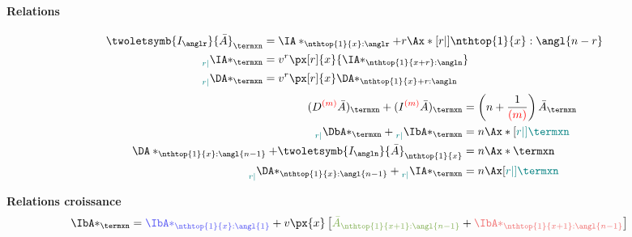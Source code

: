 \documentclass[10pt, french]{article}
\begin{document}
\begin{multicols*}{3}
\begin{enumerate}
\end{enumerate}


\paragraph{Relations} 

\begin{align*}
\twoletsymb{I_{\anglr}}{\bar{A}}_{\termxn} &= \IA*_{\nthtop{1}{x}:\anglr} + r \Ax*[r|]{\nthtop{1}{x}:\angl{n-r}}\\
	{\prescript{}{\color{teal}{r|}}{\IA*_{\termxn}}} &= v^{r} \px[r]{x} {\IA*_{\nthtop{1}{x + r}:\angln}}\\
	{\prescript{}{\color{teal}{r|}}{\DA*_{\termxn}}} &= v^{r}\px[r]{x}\DA*_{\nthtop{1}{x} + r:\angln}\\
\end{align*}
\begin{align*}
	{(D^{\color{red}{(m)}}\bar{A})_{\termxn}} + (I^{\color{red}{(m)}}\bar{A})_{\termxn} &= \left(n + \frac{1}{{\color{red}{(m)}}} \right) \bar{A}_{\termxn}\\
	{\prescript{}{\color{teal}{r|}}{\DbA*_{\termxn}}} + \prescript{}{\color{teal}{r|}}{\IbA*_{\termxn}}  &= n \Ax*[\color{teal}{r|}]{\termxn}\\	
	\DA*_{\nthtop{1}{x}:\angl{n-1}} + \twoletsymb{I_{\angln}}{\bar{A}}_{\nthtop{1}{x}} &= n \Ax*{\termxn}\\		
	{\prescript{}{\color{teal}{r|}}{\DA*_{\nthtop{1}{x}:\angl{n-1}}}} + \prescript{}{\color{teal}{r|}}{\IA*_{\termxn}}  &= n \Ax[\color{teal}{r|}]{\termxn}\\	
\end{align*}

\textbf{Relations croissance}
\begin{align*}
	\IbA*_{\termxn} &= {\color{blue_rectangle}{\IbA*_{\nthtop{1}{x}:\angl{1}}}} + v \px{x} \left[ {\color{green_rectangle}{\bar{A}_{\nthtop{1}{x + 1}:\angl{n - 1}}}} + {\color{red_rectangle}{\IbA*_{\nthtop{1}{x + 1}:\angl{n - 1}}}} \right]
\end{align*}



\end{multicols*}
\end{document}
